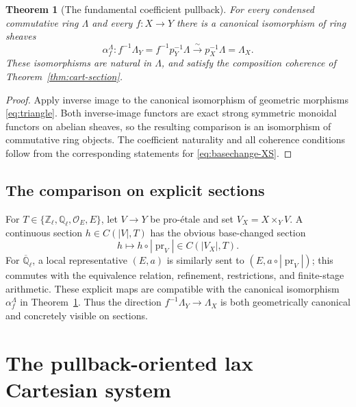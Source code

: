 \documentclass[11pt,a4paper]{article}
\numberwithin{equation}{section}
\newtheorem{theorem}{Theorem}[section]
\theoremstyle{definition}
\theoremstyle{remark}
\newcommand{\OO}{\mathcal O}
\newcommand{\Qlbar}{\overline{\mathbb Q}_{\ell}}
\begin{document}
\begin{theorem}[The fundamental coefficient pullback]
\label{thm:alpha}
For every condensed commutative ring $\Lambda$ and every $f:X\to Y$
there is a canonical isomorphism of \emph{ring sheaves}
\begin{equation}\label{eq:alpha}
   \boxed{\quad
        \alpha_f^\Lambda:
        f^{-1}\Lambda_Y=f^{-1}p_Y^{-1}\Lambda
                 \xrightarrow{\sim}p_X^{-1}\Lambda=\Lambda_X.\quad}
\end{equation}
These isomorphisms are natural in $\Lambda$, and satisfy the
composition coherence of Theorem~\ref{thm:cart-section}.
\end{theorem}
\begin{proof}
Apply inverse image to the canonical isomorphism of geometric
morphisms \eqref{eq:triangle}.  Both inverse-image functors are exact
strong symmetric monoidal functors on abelian sheaves, so the resulting
comparison is an isomorphism of commutative ring objects.
The coefficient naturality and all coherence conditions follow from
the corresponding statements for \eqref{eq:basechange-XS}.
\end{proof}

\subsection{The comparison on explicit sections}

For $T\in\{\mathbb Z_\ell,\mathbb Q_\ell,\OO_E,E\}$, let
$V\to Y$ be pro-\'{e}tale and set $V_X=X\times_YV$.  A continuous
section $h\in C(|V|,T)$ has the obvious base-changed section
\begin{equation}\label{eq:precomposition-function}
 h\longmapsto h\circ|\operatorname{pr}_V|
                         \in C(|V_X|,T).
\end{equation}
For $\Qlbar$, a local representative $(E,a)$ is similarly sent to
$(E,a\circ|\operatorname{pr}_V|)$; this commutes with the equivalence
relation, refinement, restrictions, and finite-stage arithmetic.
These explicit maps are compatible with the canonical isomorphism
$\alpha_f^\Lambda$ in Theorem~\ref{thm:alpha}.  Thus the direction
$f^{-1}\Lambda_Y\to\Lambda_X$ is both geometrically canonical and
concretely visible on sections.

\section{The pullback-oriented lax Cartesian system}
\end{document}
